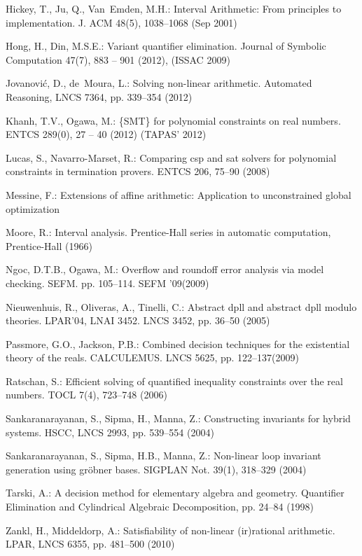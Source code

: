 \documentclass[runningheads,a4paper,oribibl]{llncs}
\begin{document}
\begin{thebibliography}{10}
Hickey, T., Ju, Q., Van~Emden, M.H.: Interval Arithmetic: From principles to
  implementation. J. ACM  48(5),  1038--1068 (Sep 2001)

Hong, H., Din, M.S.E.: Variant quantifier elimination. Journal of Symbolic
  Computation  47(7),  883 -- 901 (2012), (ISSAC 2009)

Jovanović, D., de~Moura, L.: Solving non-linear arithmetic. Automated Reasoning, LNCS 7364, pp. 339--354 (2012)

Khanh, T.V., Ogawa, M.: \{SMT\} for polynomial constraints on real numbers.
  ENTCS 289(0),  27 -- 40 (2012) (TAPAS' 2012)

Lucas, S., Navarro-Marset, R.: Comparing csp and sat solvers for polynomial
  constraints in termination provers. ENTCS   206,
   75--90 (2008)

Messine, F.: Extensions of affine arithmetic: Application to unconstrained
  global optimization

Moore, R.: Interval analysis. Prentice-Hall series in automatic computation,
  Prentice-Hall (1966)

Ngoc, D.T.B., Ogawa, M.: Overflow and roundoff error analysis via model
  checking. SEFM. pp. 105--114. SEFM '09(2009)

Nieuwenhuis, R., Oliveras, A., Tinelli, C.: Abstract dpll and abstract dpll
  modulo theories. LPAR’04, LNAI 3452. LNCS 3452, pp. 36--50 (2005)

Passmore, G.O., Jackson, P.B.: Combined decision techniques for the existential
  theory of the reals. CALCULEMUS. LNCS
  5625, pp. 122--137(2009)

Ratschan, S.: Efficient solving of quantified inequality constraints over the
  real numbers. TOCL  7(4),  723--748 (2006)

Sankaranarayanan, S., Sipma, H., Manna, Z.: Constructing invariants for hybrid
  systems. HSCC, LNCS 2993, pp. 539--554 (2004)

Sankaranarayanan, S., Sipma, H.B., Manna, Z.: Non-linear loop invariant
  generation using gr{\"o}bner bases. SIGPLAN Not.  39(1),  318--329 (2004)

Tarski, A.: A decision method for elementary algebra and geometry.
  Quantifier Elimination and Cylindrical Algebraic Decomposition, pp. 24--84 (1998)

Zankl, H., Middeldorp, A.: Satisfiability of non-linear (ir)rational
  arithmetic. LPAR, LNCS 6355, pp. 481--500 (2010)

\end{thebibliography}
\end{document}
